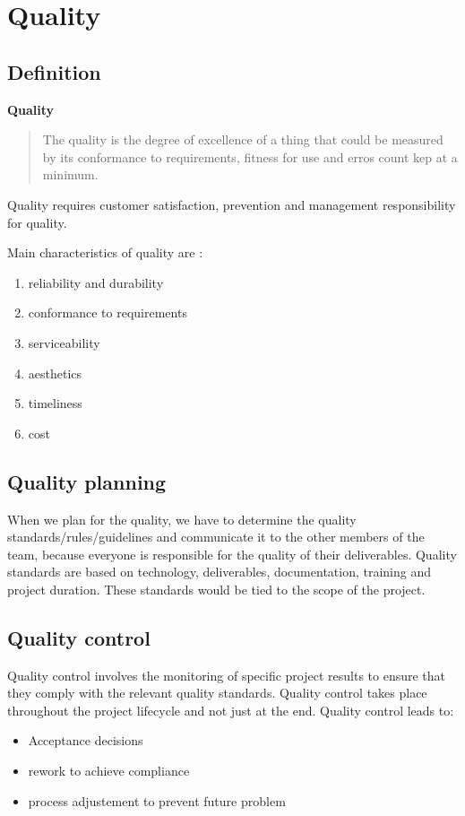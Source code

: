 \documentclass{article}
\begin{document}
\newpage
\section{Quality}
\subsection{Definition}
\textbf{Quality}
\begin{quote}
    The quality is the degree of excellence of a thing that could be measured by its conformance to requirements, fitness for use and erros count kep at a minimum.
\end{quote}

Quality requires customer satisfaction, prevention and management responsibility for quality.\newline\newline

Main characteristics of quality are :
\begin{enumerate}
    \item reliability and durability
    \item conformance to requirements
    \item serviceability
    \item aesthetics
    \item timeliness
    \item cost
\end{enumerate}

\subsection{Quality planning}
When we plan for the quality, we have to determine the quality standards/rules/guidelines and communicate it to the other members of the team, because everyone is responsible for the quality of their deliverables.\newline
Quality standards are based on technology, deliverables, documentation, training and project duration. These standards would be tied to the scope of the project.

\subsection{Quality control}
Quality control involves the monitoring of specific project results to ensure that they comply with the relevant quality standards.\newline
Quality control takes place throughout the project lifecycle and not just at the end. \newline
Quality control leads to:
\begin{itemize}
    \item Acceptance decisions
    \item rework to achieve compliance
    \item process adjustement to prevent future problem
\end{itemize}
\end{document}
